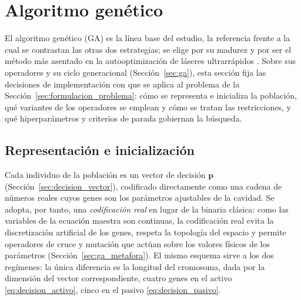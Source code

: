
\section{Algoritmo genético}
\label{sec:ga_impl}

El algoritmo genético (GA) es la línea base del estudio, la referencia frente a la cual se contrastan las otras dos estrategias; se elige por su madurez y por ser el método más asentado en la autooptimización de láseres ultrarrápidos \cite{Andral2015,Woodward2016}. Sobre sus operadores y su ciclo generacional (Sección~\ref{sec:ga}), esta sección fija las decisiones de implementación con que se aplica al problema de la Sección~\ref{sec:formulacion_problema}: cómo se representa e inicializa la población, qué variantes de los operadores se emplean y cómo se tratan las restricciones, y qué hiperparámetros y criterios de parada gobiernan la búsqueda.

\subsection{Representación e inicialización}
\label{sec:ga_representacion}

Cada individuo de la población es un vector de decisión $\mathbf{p}$
(Sección~\ref{sec:decision_vector}), codificado directamente como una cadena de
números reales cuyos genes son los parámetros ajustables de la cavidad. Se adopta,
por tanto, una \emph{codificación real} en lugar de la binaria clásica: como las
variables de la ecuación maestra son continuas, la codificación real evita la
discretización artificial de los genes, respeta la topología del espacio y permite
operadores de cruce y mutación que actúan sobre los valores físicos de los
parámetros (Sección~\ref{sec:ga_metafora}). El mismo esquema sirve a los dos
regímenes: la única diferencia es la longitud del cromosoma, dada por la dimensión
del vector correspondiente, cuatro genes en el activo \eqref{eq:decision_activo},
cinco en el pasivo \eqref{eq:decision_pasivo}.

